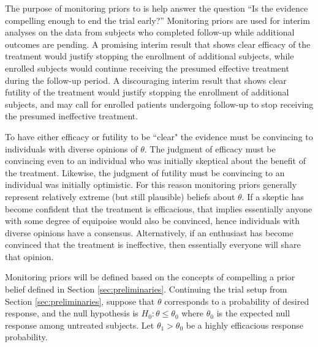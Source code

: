 \documentclass[12pt]{article}
\begin{document}
The purpose of monitoring priors to is help answer the question ``Is the evidence compelling enough to end the trial early?'' Monitoring priors are used for interim analyses on the data from subjects who completed follow-up while additional outcomes are pending. A promising interim result that shows clear efficacy of the treatment would justify stopping the enrollment of additional subjects, while enrolled subjects would continue receiving the presumed effective treatment during the follow-up period. A discouraging interim result that shows clear futility of the treatment would justify stopping the enrollment of additional subjects, and may call for enrolled patients undergoing follow-up to stop receiving the presumed ineffective treatment. 

To have either efficacy or futility to be ``clear" the evidence must be convincing to individuals with diverse opinions of $\theta$. The judgment of efficacy must be convincing even to an individual who was initially skeptical about the benefit of the treatment. Likewise, the judgment of futility must be convincing to an individual was initially optimistic. For this reason monitoring priors generally represent relatively extreme (but still plausible) beliefs about $\theta$. If a skeptic has become confident that the treatment is efficacious, 
that implies essentially anyone with some degree of equipoise would also be convinced, hence individuals with diverse opinions have a consensus. Alternatively, if an enthusiast has become convinced that the treatment is ineffective, then essentially everyone will share that opinion. 

%
%

Monitoring priors will be defined based on the concepts of compelling a prior belief defined in Section \ref{sec:preliminaries}. Continuing the trial setup from Section \ref{sec:preliminaries}, suppose that $\theta$ corresponds to a probability of desired response, and the null hypothesis is $H_0:\theta\leq\theta_0$ where $\theta_0$ is the expected null response among untreated subjects. 
%
Let $\theta_1>\theta_0$ be a highly efficacious response probability.
%
\end{document}
